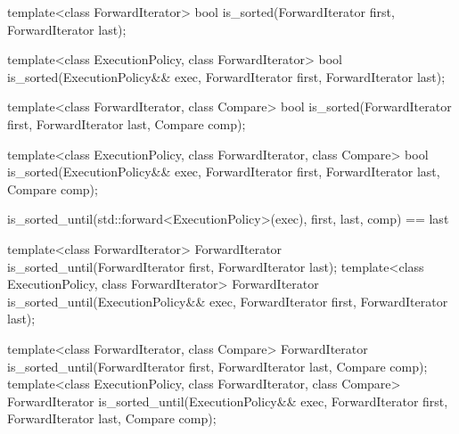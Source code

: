%
\begin{itemdecl}
template<class ForwardIterator>
  bool is_sorted(ForwardIterator first, ForwardIterator last);
\end{itemdecl}

\begin{itemdescr}
\pnum
\returns {}
\end{itemdescr}

%
\begin{itemdecl}
template<class ExecutionPolicy, class ForwardIterator>
  bool is_sorted(ExecutionPolicy&& exec,
                 ForwardIterator first, ForwardIterator last);
\end{itemdecl}

\begin{itemdescr}
\pnum
\returns {}
\end{itemdescr}


%
\begin{itemdecl}
template<class ForwardIterator, class Compare>
  bool is_sorted(ForwardIterator first, ForwardIterator last,
                 Compare comp);
\end{itemdecl}

\begin{itemdescr}
\pnum
\returns {}
\end{itemdescr}


%
\begin{itemdecl}
template<class ExecutionPolicy, class ForwardIterator, class Compare>
  bool is_sorted(ExecutionPolicy&& exec,
                 ForwardIterator first, ForwardIterator last,
                 Compare comp);
\end{itemdecl}

\begin{itemdescr}
\pnum
\returns
\begin{codeblock}
is_sorted_until(std::forward<ExecutionPolicy>(exec), first, last, comp) == last
\end{codeblock}
\end{itemdescr}


%
\begin{itemdecl}
template<class ForwardIterator>
  ForwardIterator is_sorted_until(ForwardIterator first, ForwardIterator last);
template<class ExecutionPolicy, class ForwardIterator>
  ForwardIterator is_sorted_until(ExecutionPolicy&& exec,
                                  ForwardIterator first, ForwardIterator last);

template<class ForwardIterator, class Compare>
  ForwardIterator is_sorted_until(ForwardIterator first, ForwardIterator last,
                                  Compare comp);
template<class ExecutionPolicy, class ForwardIterator, class Compare>
  ForwardIterator is_sorted_until(ExecutionPolicy&& exec,
                                  ForwardIterator first, ForwardIterator last,
                                  Compare comp);
\end{itemdecl}


